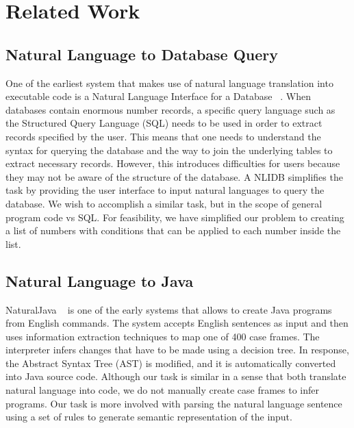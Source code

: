 \documentclass[11pt,letterpaper]{article}
\begin{document}
\section{Related Work}

\subsection{Natural Language to Database Query}

One of the earliest system that makes use of natural language translation into executable code is a Natural Language Interface for a Database ~\cite{Androutsopoulos1995NaturalLI}. 
When databases contain enormous number records, a specific query language such as the Structured Query Language (SQL) needs to be used in order to extract records specified by the user. 
This means that one needs to understand the syntax for querying the database and the way to join the underlying tables to extract necessary records. 
However, this introduces difficulties for users because they may not be aware of the structure of the database. 
A NLIDB simplifies the task by providing the user interface to input natural languages to query the database.
We wish to accomplish a similar task, but in the scope of general program code vs SQL.
For feasibility, we have simplified our problem to creating a list of numbers with conditions that can be applied to each number inside the list.   

\subsection{Natural Language to Java}
NaturalJava ~\cite{Price2000NaturalJavaAN} is one of the early systems that 
allows to create Java programs from English commands. 
The system accepts English sentences as input and then uses information extraction techniques to map one of 400 case frames. 
The interpreter infers changes that have to be made using a decision tree. In response, the Abstract Syntax Tree (AST) is modified, and it is automatically converted into Java source code. Although our task is similar in a sense that both translate natural language into code, we do not manually create case frames to infer programs. 
Our task is more involved with parsing the natural language sentence using a set of rules to generate semantic representation of the input.
\end{document}
